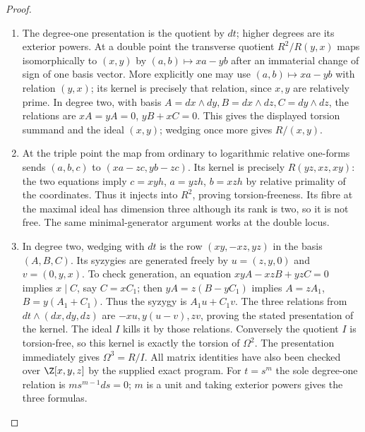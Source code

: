 \begin{proof}
\begin{enumerate}[label=\arabic*.,leftmargin=*]
\item The degree-one presentation is the quotient by $dt$; higher degrees
are its exterior powers.  At a double point the transverse quotient
$R^2/R(y,x)$ maps isomorphically to $(x,y)$ by
$(a,b)\mapsto xa-yb$ after an immaterial change of sign of one
basis vector.  More explicitly one may use
$(a,b)\mapsto xa-yb$ with relation $(y,x)$; its kernel is precisely
that relation, since $x,y$ are relatively prime.  In degree two,
with basis $A=dx\wedge dy,B=dx\wedge dz,C=dy\wedge dz$, the
relations are $xA=yA=0$, $yB+xC=0$.  This gives the displayed
torsion summand and the ideal $(x,y)$; wedging once more gives
$R/(x,y)$.

\item At the triple point the map from ordinary to logarithmic relative
one-forms sends $(a,b,c)$ to $(xa-zc,yb-zc)$.
Its kernel is precisely $R(yz,xz,xy)$: the two equations imply
$c=xyh$, $a=yzh$, $b=xzh$ by relative primality of the coordinates.
Thus it injects into $R^2$, proving torsion-freeness.  Its fibre at
the maximal ideal has dimension three although its rank is two,
so it is not free.  The same minimal-generator argument works at
the double locus.

\item In degree two, wedging with $dt$ is the row
$(xy,-xz,yz)$ in the basis $(A,B,C)$.
Its syzygies are generated freely by
$u=(z,y,0)$ and $v=(0,y,x)$.
To check generation, an equation $xyA-xzB+yzC=0$ implies
$x\mid C$, say $C=xC_1$; then $yA=z(B-yC_1)$ implies
$A=zA_1$, $B=y(A_1+C_1)$.  Thus the syzygy is $A_1u+C_1v$.
The three relations from $dt\wedge(dx,dy,dz)$ are
$-xu,y(u-v),zv$, proving the stated presentation of the kernel.
The ideal $I$ kills it by those relations.  Conversely the quotient
$I$ is torsion-free, so this kernel is exactly the torsion of
$\Omega^2$.  The presentation immediately gives $\Omega^3=R/I$.
All matrix identities have also been checked over $\Z[x,y,z]$ by
the supplied exact program.  For $t=s^m$ the sole degree-one
relation is $ms^{m-1}ds=0$; $m$ is a unit and taking exterior
powers gives the three formulas.
\end{enumerate}
\end{proof}

